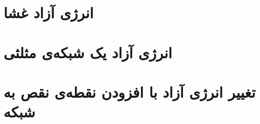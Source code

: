 \section{
انرژی آزاد غشا
}



\section{
انرژی آزاد یک شبکه‌ی مثلثی
}


\section{
تغییر انرژی آزاد با افزودن نقطه‌ی نقص به شبکه
}









